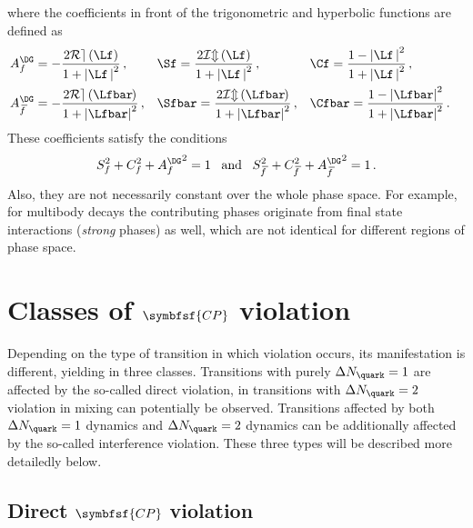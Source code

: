 where the coefficients in front of the trigonometric and hyperbolic functions are defined as
\begin{align}
&A_f^{\DG}=-\frac{2\mathcal{Re}\left(\Lf\right)}{1+\left|\Lf\,\right|^2}\,,&
&\Sf=\frac{2\mathcal{Im}\left(\Lf\right)}{1+\left|\Lf\,\right|^2}\,,&
&\Cf=\frac{1-\left|\Lf\,\right|^2}{1+\left|\Lf\,\right|^2}\,,&\label{eq:cpcoeff}\\
&A_{\kern 1.5pt\overline{\kern -1.5pt f\kern 1.5pt}}^{\DG}=-\frac{2\mathcal{Re}\left(\Lfbar\kern -0.1em\right)}{1+\left|\Lfbar\right|^2}\,,&
&\Sfbar=\frac{2\mathcal{Im}\left(\Lfbar\kern -0.1em\right)}{1+\left|\Lfbar\right|^2}\,,&
&\Cfbar=\frac{1-\left|\Lfbar\right|^2}{1+\left|\Lfbar\right|^2}\,.&\label{eq:cpcoeffbar}
\end{align}
These coefficients satisfy the conditions
\begin{equation}
S_{f}^2+C_{f}^2+{A_f^{\DG}}^2=1\,\,\,\,\,\text{and}\,\,\,\,\,S_{\kern 1.5pt\overline{\kern -1.5pt f\kern 1.5pt}}^2+C_{\kern 1.5pt\overline{\kern -1.5pt f\kern 1.5pt}}^2+{A_{\kern 1.5pt\overline{\kern -1.5pt f\kern 1.5pt}}^{\DG}}^2=1\,.\label{eq:CpCoeffCond}
\end{equation}
Also, they are not necessarily constant over the whole phase space.
For example, for multibody decays the contributing phases originate from final state interactions (\ie \emph{strong} phases) as well, which are not identical for different regions of phase space.

\section[head={Classes of \CP violation},tocentry={Classes of \CP violation}]{Classes of $\symbfsf{C{}P}$ violation}
\label{sec:CPVClasses}

Depending on the type of transition in which \CP violation occurs, its manifestation is different, yielding in three classes.
Transitions with purely $\Delta N_\quark=1$ are affected by the so-called direct \CP violation, in transitions with $\Delta N_\quark=2$ \CP violation in mixing can potentially be observed.
Transitions affected by both $\Delta N_\quark=1$ dynamics and $\Delta N_\quark=2$ dynamics can be additionally affected by the so-called interference \CP violation.
These three types will be described more detailedly below.


\subsection[head={Direct \CP violation},tocentry={Direct \CP violation}]{Direct $\symbfsf{C{}P}$ violation}
\label{sec:DirectCPV}

